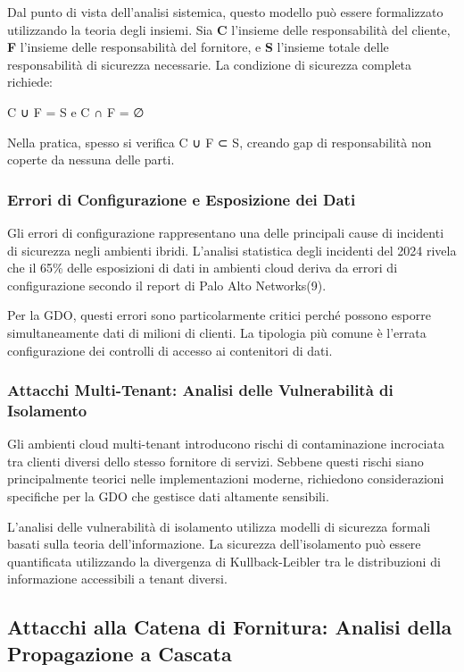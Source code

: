 \documentclass[12pt,a4paper,oneside]{book}
\begin{document}
Dal punto di vista dell'analisi sistemica, questo modello può essere formalizzato utilizzando la teoria degli insiemi. Sia \textbf{C} l'insieme delle responsabilità del cliente, \textbf{F} l'insieme delle responsabilità del fornitore, e \textbf{S} l'insieme totale delle responsabilità di sicurezza necessarie. La condizione di sicurezza completa richiede:

C ∪ F = S e C ∩ F = ∅

Nella pratica, spesso si verifica C ∪ F ⊂ S, creando gap di responsabilità non coperte da nessuna delle parti.

\subsubsection{Errori di Configurazione e Esposizione dei Dati}

Gli errori di configurazione rappresentano una delle principali cause di incidenti di sicurezza negli ambienti ibridi. L'analisi statistica degli incidenti del 2024 rivela che il 65\% delle esposizioni di dati in ambienti cloud deriva da errori di configurazione secondo il report di Palo Alto Networks(9).

Per la GDO, questi errori sono particolarmente critici perché possono esporre simultaneamente dati di milioni di clienti. La tipologia più comune è l'errata configurazione dei controlli di accesso ai contenitori di dati.

\subsubsection{Attacchi Multi-Tenant: Analisi delle Vulnerabilità di Isolamento}

Gli ambienti cloud multi-tenant introducono rischi di contaminazione incrociata tra clienti diversi dello stesso fornitore di servizi. Sebbene questi rischi siano principalmente teorici nelle implementazioni moderne, richiedono considerazioni specifiche per la GDO che gestisce dati altamente sensibili.

L'analisi delle vulnerabilità di isolamento utilizza modelli di sicurezza formali basati sulla teoria dell'informazione. La sicurezza dell'isolamento può essere quantificata utilizzando la divergenza di Kullback-Leibler tra le distribuzioni di informazione accessibili a tenant diversi.

\subsection{Attacchi alla Catena di Fornitura: Analisi della Propagazione a Cascata}
\end{document}
